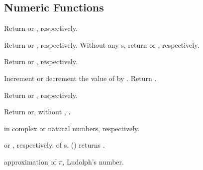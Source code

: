 \subsection[Numeric~Functns]{Numeric Functions} 

\begin{LIST}{1cm}

  {
  Return  or , respectively.
  }

  {
  Return  or , respectively. Without any
  s, return  or , respectively.
  }

  {Return  or
  , respectively.
  }

  {
  Increment or decrement the value of  by . Return .
  }

     {
       Return  or , respectively.
     }

  {
  Return  or,
  without , .
  }

  {
     in complex or natural numbers, respectively.
  }

  {
   or , respectively, of s. ()
  returns .
  }

  {
   approximation of $\pi$, Ludolph's number.
  }


\end{LIST}
